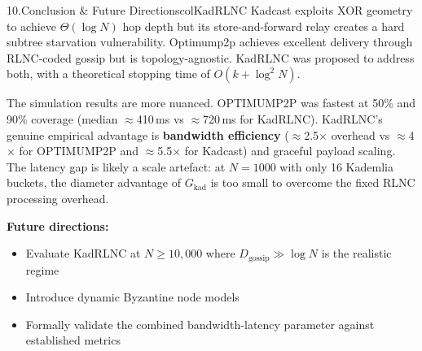 \documentclass[final]{beamer}
\newlength{\colwidth}
\begin{document}
\begin{frame}[t]
\begin{columns}[T, totalwidth=0.97\paperwidth]
\begin{column}{\colwidth}
\begin{panel}{10.\enspace Conclusion \& Future Directions}{colKadRLNC}
  Kadcast exploits XOR geometry to achieve $\Theta(\log N)$ hop depth but its store-and-forward relay creates a hard subtree starvation vulnerability. Optimump2p achieves excellent delivery through RLNC-coded gossip but is topology-agnostic. KadRLNC was proposed to address both, with a theoretical stopping time of $O(k + \log^2 N)$.

  \vspace{7pt}
  
  The simulation results are more nuanced. OPTIMUMP2P was fastest at 50\% and 90\% coverage (median $\approx$410\,ms vs $\approx$720\,ms for KadRLNC). KadRLNC's genuine empirical advantage is \textbf{bandwidth efficiency} ($\approx$2.5$\times$ overhead vs $\approx$4$\times$ for OPTIMUMP2P and $\approx$5.5$\times$ for Kadcast) and graceful payload scaling. The latency gap is likely a scale artefact: at $N=1000$ with only 16 Kademlia buckets, the diameter advantage of $G_{\mathrm{kad}}$ is too small to overcome the fixed RLNC processing overhead.
  
  \vspace{7pt}
  
  \textbf{Future directions:}
  \begin{itemize}\setlength\itemsep{4pt}
    \item Evaluate KadRLNC at $N \geq 10{,}000$ where $D_{\mathrm{gossip}} \gg \log N$ is the realistic regime
    \item Introduce dynamic Byzantine node models
    \item Formally validate the combined bandwidth-latency parameter against established metrics
  \end{itemize}

\end{panel}

\end{column}

\end{columns}


\vspace{8mm}


\begin{tcolorbox}[
  enhanced, colback=colHeaderBg, colframe=colHeaderBg,
  arc=0pt, boxrule=0pt,
  width=0.97\paperwidth, left=18mm, right=18mm, top=10mm, bottom=10mm
  ]
  

\end{tcolorbox}
\end{frame}
\end{document}
